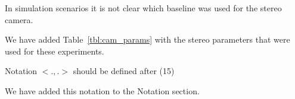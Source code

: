 In simulation scenarios it is not clear which baseline was used for the stereo camera.
\begin{response}
    We have added Table~\ref{tbl:cam_params} with the stereo parameters that were used for these experiments.
\end{response}

Notation $<.,.>$ should be defined after (15)
\begin{response}
We have added this notation to the Notation section.
\end{response}

\endgroup

\newpage
\setcounter{page}{1} 
\setcounter{section}{0}
\twocolumn
